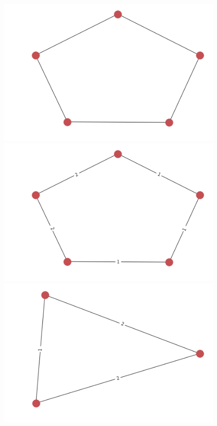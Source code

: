 \documentclass{article}
\theoremstyle{definition}
\begin{document}
\begin{figure}[!htb]
	\begin{multicols}{4}
		\includegraphics[width=\linewidth]{data/generated-graphs/ring_base.png}\par
		\includegraphics[width=\linewidth]{data/generated-graphs/ring_labels.png}\par
		\includegraphics[width=\linewidth]{data/generated-graphs/ring_altered_struct.png}\par

\end{multicols}
\end{figure}
\end{document}
